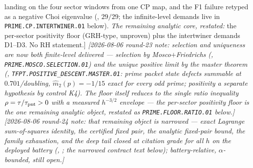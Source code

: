 \documentclass[11pt,a4paper]{article}
\begin{document}
{{landing on the four sector windows from one CP map, and the F1
failure retyped as a negative Choi eigenvalue
(, $29/29$; the
infinite-level demands live in
\texttt{PRIME.CP.INTERTWINER.01} below).  \emph{The remaining
analytic core, restated:} the per-sector positivity floor
(GRH-type, unproven) plus the intertwiner demands D1--D3.  No RH
statement.]}
\emph{[2026-08-06 round-23 note: selection and uniqueness are now
both finite-level delivered --- selection by Mosco$+$Friedrichs
(,
\texttt{PRIME.MOSCO.SELECTION.01}) and the unique positive limit
by the master theorem
(,
\texttt{TFPT.POSITIVE\_DESCENT.MASTER.01}: prime packet state
defects summable at $0.701$/doubling, $\hat m_2(p)=-1/15$ exact
for every odd prime; positivity a \emph{separate} hypothesis by
control K4).  The floor itself reduces to the single ratio
inequality $\rho=\tau/\tau_{\rm pnt}>0$ with a measured
$h^{-3/2}$ envelope --- the per-sector positivity floor is the
\emph{one} remaining analytic object, restated as
\texttt{PRIME.FLOOR.RATIO.01} below.]}
\emph{[2026-08-06 round-24 note: that remaining object is
\emph{narrowed} --- exact Lagrange sum-of-squares identity, the
certified fixed pair, the analytic fixed-pair bound, the family
exhaustion, and the deep tail closed at citation grade for all
$h$ on the deployed battery
(,
; the narrowed contract
text below); battery-relative, $\alpha$-bounded, still open.]}\par}
\end{document}

